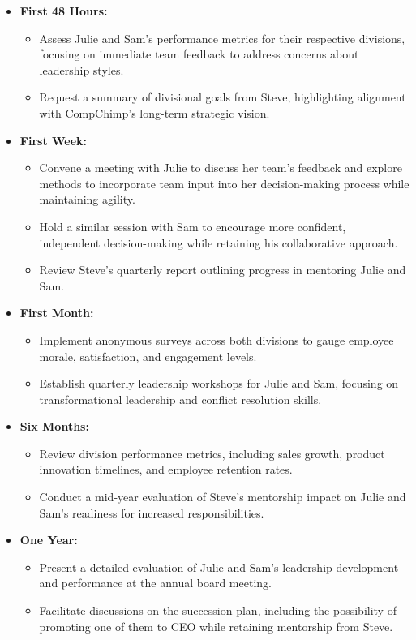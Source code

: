 \documentclass[a4paper,12pt]{article}
\begin{document}
\begin{itemize}
    \item \textbf{First 48 Hours:}
    \begin{itemize}
        \item Assess Julie and Sam's performance metrics for their respective divisions, focusing on immediate team feedback to address concerns about leadership styles.
        \item Request a summary of divisional goals from Steve, highlighting alignment with CompChimp's long-term strategic vision.
    \end{itemize}
    \item \textbf{First Week:}
    \begin{itemize}
        \item Convene a meeting with Julie to discuss her team's feedback and explore methods to incorporate team input into her decision-making process while maintaining agility.
        \item Hold a similar session with Sam to encourage more confident, independent decision-making while retaining his collaborative approach.
        \item Review Steve’s quarterly report outlining progress in mentoring Julie and Sam.
    \end{itemize}
    \item \textbf{First Month:}
    \begin{itemize}
        \item Implement anonymous surveys across both divisions to gauge employee morale, satisfaction, and engagement levels.
        \item Establish quarterly leadership workshops for Julie and Sam, focusing on transformational leadership and conflict resolution skills.
    \end{itemize}
    \item \textbf{Six Months:}
    \begin{itemize}
        \item Review division performance metrics, including sales growth, product innovation timelines, and employee retention rates.
        \item Conduct a mid-year evaluation of Steve’s mentorship impact on Julie and Sam’s readiness for increased responsibilities.
    \end{itemize}
    \item \textbf{One Year:}
    \begin{itemize}
        \item Present a detailed evaluation of Julie and Sam’s leadership development and performance at the annual board meeting.
        \item Facilitate discussions on the succession plan, including the possibility of promoting one of them to CEO while retaining mentorship from Steve.
    \end{itemize}
\end{itemize}
\end{document}
